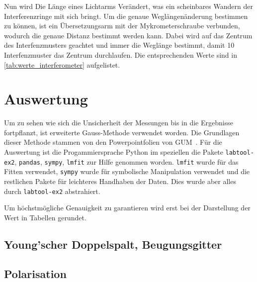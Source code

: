 \documentclass[12pt,english,ngerman]{scrartcl}
\begin{document}
Nun wird Die Länge eines Lichtarms Verändert, was ein scheinbares Wandern der Interferenzringe mit sich bringt. Um die genaue 
Weglängenänderung bestimmen zu können, ist ein Übersetzungsarm mit der Mykrometerschraube verbunden, wodurch die genaue 
Distanz bestimmt werden kann. Dabei wird auf das Zentrum des Interfenzmusters geachtet und immer die Weglänge bestimmt,
damit 10 Interfenzmuster das Zentrum durchlaufen. Die entsprechenden Werte sind in \autoref{tab:werte_interferometer} aufgelistet.



\section{Auswertung}\label{sec:auswertung}

Um zu sehen wie sich die Unsicherheit der Messungen bis in die Ergebnisse
fortpflanzt, ist erweiterte Gauss-Methode verwendet worden. Die Grundlagen
dieser Methode stammen von den Powerpointfolien von
GUM~\cite{wolfgang_kessel_isobipm-gum_2004}. Für die Auswertung ist die
Progammiersprache Python im speziellen die Pakete \verb#labtool-ex2#,
\verb#pandas#, \verb#sympy#, \verb#lmfit# zur Hilfe genommen worden.
\verb#lmfit# wurde für das Fitten verwendet, \verb#sympy# wurde für symbolische
Manipulation verwendet und die restlichen Pakete für leichteres Handhaben der
Daten. Dies wurde aber alles durch \verb#labtool-ex2# abstrahiert.

Um höchstmögliche Genauigkeit zu garantieren wird erst bei der Darstellung der
Wert in Tabellen gerundet.

\subsection{Young'scher Doppelspalt, Beugungsgitter}



\subsection{Polarisation}
\end{document}
